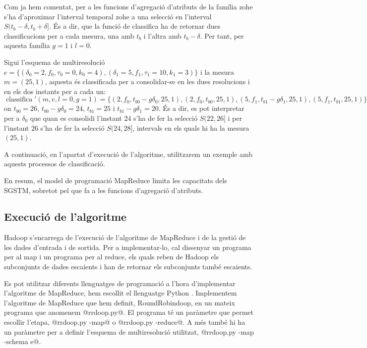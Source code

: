 \begin{example}
  \label{ex:mapreduce:fzohe} 
  Com ja hem comentat, per a les funcions d'agregació d'atributs de la
  família \gls{zohe} s'ha d'aproximar l'interval temporal \gls{zohe} a
  una selecció en l'interval $S(t_b-\delta,t_b+\delta]$. És a dir, que
  la funció de classifica ha de retornar dues classificacions per a
  cada mesura, una amb $t_b$ i l'altra amb $t_b-\delta$. Per tant, per
  aquesta família $g=1$ i $l=0$.

  Sigui l'esquema de multiresolució
  $e=\{(\delta_0=2,f_0,\tau_0=0,k_0=4),(\delta_1=5,f_1,\tau_1=10,k_1=3)\}$
  i la mesura $m=(25,1)$, aquesta és classificada per a consolidar-se
  en les dues resolucions i en els dos instants per a cada un:
  $\operatorname{classifica}'(m,e,l=0,g=1)=\{
  (2,f_0,t_{b0}-g\delta_0,25,1), (2,f_0,t_{b0},25,1),
  (5,f_1,t_{b1}-g\delta_1,25,1), (5,f_1,t_{b1},25,1) \}$ on $t_{b0}=
  26$, $t_{b0}-g\delta_0= 24$, $t_{b1}= 25$ i $t_{b1}-g\delta_1= 20$.
  És a dir, es pot interpretar per a $\delta_0$ que quan es consolidi
  l'instant $24$ s'ha de fer la selecció $S(22,26]$ i per l'instant
  $26$ s'ha de fer la selecció $S(24,28]$, intervals en els quals hi
  ha la mesura $(25,1)$.

  A continuació, en l'apartat d'execució de l'algoritme, utilitzarem un exemple
  amb aquests processos de classificació.
\end{example}






En resum, el model de programació MapReduce limita les capacitats dels
\gls{SGSTM}, sobretot pel que fa a les funcions d'agregació
d'atributs. 






\subsection{Execució de l'algoritme}


Hadoop s'encarrega de l'execució de l'algoritme de MapReduce i de la
gestió de les dades d'entrada i de sortida.  Per a implementar-lo, cal
dissenyar un programa per al map i un programa per al reduce, els
quals reben de Hadoop els subconjunts de dades escaients i han de
retornar els subconjunts també escaients.  

Es pot utilitzar diferents llenguatges de programació a l'hora
d'implementar l'algoritme de MapReduce, hem escollit el llenguatge
Python \parencite{python:doc2}.  Implementem l'algoritme de MapReduce
que hem definit, RoundRobindoop, en un mateix programa que anomenem
@rrdoop.py@. El programa té un paràmetre que permet escollir l'etapa,
@rrdoop.py -map@ o @rrdoop.py -reduce@. A més també hi ha un paràmetre
per a definir l'esquema de multiresolució utilitzat, %
@rrdoop.py -map -schema e@.

